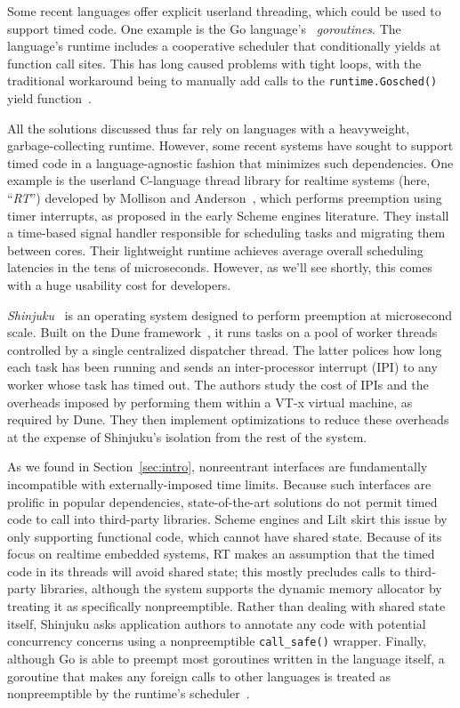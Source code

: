 Some recent languages offer explicit userland threading, which could be used to
support timed
code.  One example is the Go language's~\cite{www-golang} \textit{goroutines}.
The language's runtime includes a cooperative scheduler that conditionally yields
at function call sites.  This has long caused problems with tight loops, with the
traditional workaround being to manually add calls to the \texttt{runtime.Gosched()}
yield function~\cite{www-golang-tightloop}.

All the solutions discussed thus far rely on languages with a heavyweight,
garbage-collecting runtime.  However, some recent systems have sought
to support timed code in a language-agnostic fashion that minimizes such
dependencies.  One example is the userland C-language thread library for realtime
systems (here, ``\textit{RT}'') developed by Mollison and
Anderson~\cite{mollison:rtas2013}, which performs
preemption using timer interrupts, as proposed in the early Scheme engines
literature.  They install a time-based signal handler responsible for scheduling
tasks and migrating them between cores.  Their lightweight runtime
achieves average overall scheduling latencies in the tens of microseconds.
However, as we'll see shortly, this comes with a huge usability cost for developers.

\textit{Shinjuku}~\cite{Kaffes:nsdi2019} is an operating system designed to perform
preemption at microsecond scale.  Built on the Dune framework~\cite{Belay:osdi2012},
it runs tasks on a pool of worker threads controlled by a single centralized
dispatcher thread.  The latter polices how long each task has been running and
sends an inter-processor interrupt (IPI) to any worker whose task has timed out.
The authors study the cost of IPIs and the overheads
imposed by performing them within a VT-x virtual machine, as required by Dune.  They
then implement optimizations to reduce these overheads at the expense of Shinjuku's
isolation from the rest of the system.

As we found in Section~\ref{sec:intro}, nonreentrant interfaces are fundamentally
incompatible with externally-imposed time limits.  Because such interfaces are
prolific in popular dependencies, state-of-the-art solutions do not permit timed code
to call into third-party libraries.  Scheme engines and
Lilt skirt this issue by only supporting functional code, which cannot have shared
state.  Because of its focus on realtime embedded systems, RT makes an assumption
that the timed code in its threads will avoid shared state; this mostly precludes
calls to third-party libraries, although the system supports the dynamic memory
allocator by treating it as specifically nonpreemptible.  Rather than dealing with
shared state itself, Shinjuku asks application authors to annotate any code with
potential concurrency concerns using a nonpreemptible \texttt{call\_safe()} wrapper.
Finally, although Go is able to preempt most goroutines written in the language
itself, a
goroutine that makes any foreign calls to other languages is treated as
nonpreemptible by the runtime's scheduler~\cite{www-golang-fficall}.

